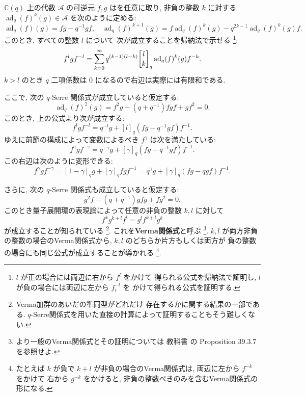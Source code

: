 \documentclass[12pt,twoside,dvipdfm]{msjproc}
\newcommand\C{{\mathbb C}} %
\theoremstyle{definition} %
\theoremstyle{definition} %
\theoremstyle{definition} %
\numberwithin{theorem}{section}
\numberwithin{equation}{section}
\numberwithin{figure}{section}
\numberwithin{table}{section}
\newcommand\A{\mathcal{A}}
\newcommand\ad{\mathop{\mathrm{ad}}\nolimits}
\begin{document}
$\C(q)$ 上の代数 $\A$ の可逆元 $f,g$ はを任意に取り, 
非負の整数 $k$ に対する $\ad_q(f)^k(g)\in\A$ を次のように定める:
\begin{equation*}
  \ad_q(f)(g)= fg - q^{-1} gf, \quad
  \ad_q(f)^{k+1}(g) = f\ad_q(f)^k(g) - q^{2k-1}\ad_q(f)^k(g) f.
\end{equation*}
このとき, すべての整数 $l$ について
次が成立することを帰納法で示せる%
\footnote{$l$ が正の場合には両辺に右から $f^l$ をかけて
得られる公式を帰納法で証明し, $l$ が負の場合には両辺に左から $f_i^{-l}$ を
かけて得られる公式を証明する.}:
\begin{equation*}
  f^l g f^{-l} = 
  \sum_{k=0}^\infty q^{(k-1)(l-k)}\qbinom{l}{k}_q \ad_q(f)^k(g) f^{-k}.
\end{equation*}
$k>l$ のとき $q$ 二項係数は $0$ になるので右辺は実際には有限和である.

ここで, 次の $q$-Serre 関係式が成立していると仮定する:
\begin{equation*}
 \ad_q(f)^2(g) = f^2 g - (q+q^{-1})fgf + gf^2 = 0.
\end{equation*}
このとき, 上の公式より次が成立する:
\begin{equation*}
  f^l g f^{-l} = q^{-l}g + [l]_q(fg-q^{-1}gf)f^{-1}.
\end{equation*}
ゆえに前節の構成によって変数によるべき $f^\gamma$ は次を満たしている:
\begin{equation*}
 f^\gamma g f^{-\gamma} 
 = q^{-\gamma} g + [\gamma]_q(fg-q^{-1}gf)f^{-1}.
\end{equation*}
この右辺は次のように変形できる:
\begin{equation*}
 f^\gamma g f^{-\gamma}
 = [1-\gamma]_q g + [\gamma]_q fgf^{-1}
 = q^\gamma g + [\gamma]_q(fg-qgf)f^{-1}.
\end{equation*}

さらに, 次の $q$-Serre 関係式も成立していると仮定する:
\begin{equation*}
 g^2 f - (q+q^{-1})gfg + fg^2 = 0.
\end{equation*}
このとき量子展開環の表現論によって任意の非負の整数 $k,l$ に対して
\begin{equation*}
  f^k g^{k+l} f^l = g^l f^{k+l} g^k
\end{equation*}
が成立することが知られている%
\footnote{Verma加群のあいだの準同型がどれだけ
存在するかに関する結果の一部である.
$q$-Serre関係式を用いた直接の計算によって証明することもそう難しくない.}.
これを{\bf Verma関係式}と呼ぶ%
\footnote{より一般のVerma関係式とその証明については
教科書 \cite{Lusztig} の Proposition 39.3.7 を参照せよ.}.
$k,l$ が両方非負の整数の場合のVerma関係式から, 
$k,l$ のどちらか片方もしくは両方が
負の整数の場合にも同じ公式が成立することが導かれる%
\footnote{たとえば $k$ が負で $k+l$ が非負の場合のVerma関係式は, 
両辺に左から $f^{-k}$ をかけて 
右から $g^{-k}$ をかけると, 
非負の整数べきのみを含むVerma関係式の形になる.}.
\end{document}
